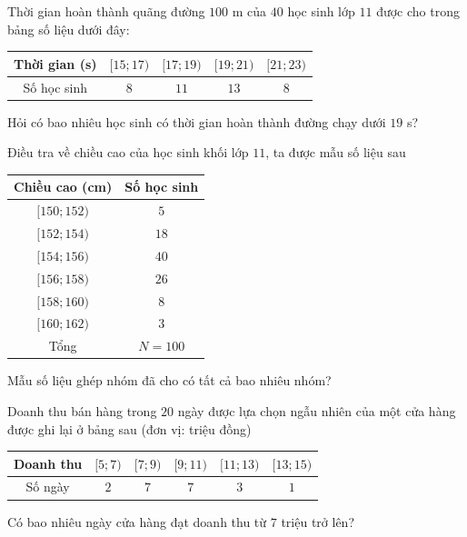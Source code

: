 \begin{ex}%
	Thời gian hoàn thành quãng đường $100$ m của $40$ học sinh lớp $11$ được cho trong bảng số liệu  dưới đây:
	\begin{center}
		\begin{tabular}{|c|c|c|c|c|}
			\hline 
			Thời gian (s) & $[15;17)$ & $[17;19)$ &  $[19;21)$ & $[21;23)$ \\
			\hline 
			Số học sinh & $8$ & $11$ &  $13$ & $8$ \\
			 \hline
		\end{tabular}
	\end{center}
	Hỏi có bao nhiêu học sinh có thời gian hoàn thành  đường chạy dưới $19$ s?
\end{ex}

\begin{ex}%
	Điều tra về chiều cao của học sinh khối lớp $11$, ta  được mẫu số liệu sau
	\begin{center}
		\begin{tabular}{|c|c|}
			 \hline
			Chiều  cao (cm) & Số học sinh \\
			\hline 
			$[150;152)$ & $5$ \\ 
			\hline 
			 $[152;154)$ & $18$ \\
			\hline 
			$[154;156)$ &  $40$ \\
			 \hline
			$[156;158)$ &  $26$ \\
			 \hline
			$[158;160)$  & $8$ \\
			\hline 
			$[160;162)$ & $3$ \\ 
			\hline 
			Tổng & $N=100$  \\
			\hline 
		\end{tabular}
	\end{center}
	Mẫu số liệu ghép nhóm đã cho có tất cả  bao nhiêu nhóm?
\end{ex}

\begin{ex}%
	Doanh thu bán hàng trong $20$ ngày được lựa chọn  ngẫu nhiên của một cửa hàng được ghi lại ở bảng sau (đơn vị: triệu đồng)
	\begin{center}
		\begin{tabular}{|c|c|c|c|c|c|}
			 \hline
			Doanh  thu & $[5;7)$ & $[7;9)$ & $[9;11)$ & $[11;13)$ & $[13;15)$ \\
			 \hline
			Số ngày & $2$ & $7$ & $7$ &  $3$ & $1$ \\
			\hline 
		\end{tabular}
	\end{center}
	Có bao nhiêu  ngày cửa hàng đạt doanh thu từ $7$ triệu trở lên?
\end{ex}

